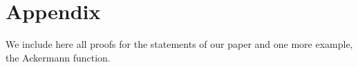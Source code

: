 \section{Appendix}
We include here all proofs for the statements of our paper and one more example,
the Ackermann function.





